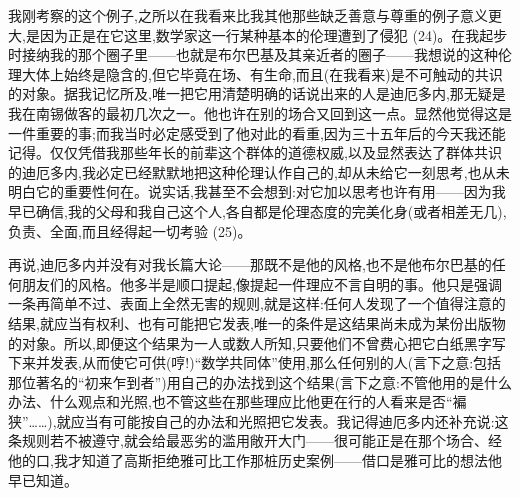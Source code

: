我刚考察的这个例子,之所以在我看来比我其他那些缺乏善意与尊重的例子意义更大,是因为正是在它这里,数学家这一行某种基本的伦理遭到了侵犯 (24)。在我起步时接纳我的那个圈子里——也就是布尔巴基及其亲近者的圈子——我想说的这种伦理大体上始终是隐含的,但它毕竟在场、有生命,而且(在我看来)是不可触动的共识的对象。据我记忆所及,唯一把它用清楚明确的话说出来的人是迪厄多内,那无疑是我在南锡做客的最初几次之一。他也许在别的场合又回到这一点。显然他觉得这是一件重要的事;而我当时必定感受到了他对此的看重,因为三十五年后的今天我还能记得。仅仅凭借我那些年长的前辈这个群体的道德权威,以及显然表达了群体共识的迪厄多内,我必定已经默默地把这种伦理认作自己的,却从未给它一刻思考,也从未明白它的重要性何在。说实话,我甚至不会想到:对它加以思考也许有用——因为我早已确信,我的父母和我自己这个人,各自都是伦理态度的完美化身(或者相差无几),负责、全面,而且经得起一切考验 (25)。

 再说,迪厄多内并没有对我长篇大论——那既不是他的风格,也不是他布尔巴基的任何朋友们的风格。他多半是顺口提起,像提起一件理应不言自明的事。他只是强调一条再简单不过、表面上全然无害的规则,就是这样:任何人发现了一个值得注意的结果,就应当有权利、也有可能把它发表,唯一的条件是这结果尚未成为某份出版物的对象。所以,即便这个结果为一人或数人所知,只要他们不曾费心把它白纸黑字写下来并发表,从而使它可供(哼!)“数学共同体”使用,那么任何别的人(言下之意:包括那位著名的“初来乍到者”)用自己的办法找到这个结果(言下之意:不管他用的是什么办法、什么观点和光照,也不管这些在那些理应比他更在行的人看来是否“褊狭”……),就应当有可能按自己的办法和光照把它发表。我记得迪厄多内还补充说:这条规则若不被遵守,就会给最恶劣的滥用敞开大门——很可能正是在那个场合、经他的口,我才知道了高斯拒绝雅可比工作那桩历史案例——借口是雅可比的想法他早已知道。

